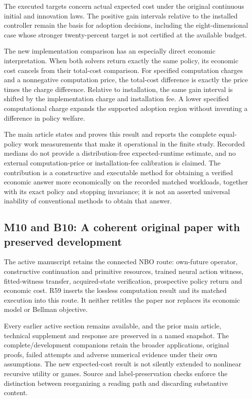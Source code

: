 \documentclass[ecta,nameyear,draft]{econsocart}
\begin{document}
The executed targets concern actual expected cost under the original
continuous initial and innovation laws. The positive gain intervals
relative to the installed controller remain the basis for adoption
decisions, including the eight-dimensional case whose stronger
twenty-percent target is not certified at the available budget.

The new implementation comparison has an especially direct economic
interpretation. When both solvers return exactly the same policy, its
economic cost cancels from their total-cost comparison. For specified
computation charges and a nonnegative computation price, the total-cost
difference is exactly the price times the charge difference. Relative to
installation, the same gain interval is shifted by the implementation
charge and installation fee. A lower specified computational charge
expands the supported adoption region without inventing a difference in
policy welfare.

The main article states and proves this result and reports the complete
equal-policy work measurements that make it operational in the finite
study. Recorded medians do not provide a distribution-free
expected-runtime estimate, and no external computation-price or
installation-fee calibration is claimed. The contribution is a
constructive and executable method for obtaining a verified economic
answer more economically on the recorded matched workloads, together
with its exact policy and stopping invariance; it is not an asserted
universal inability of conventional methods to obtain that answer.

\hypertarget{m10-and-b10-a-coherent-original-paper-with-preserved-development}{%
\subsection{M10 and B10: A coherent original paper with preserved
development}\label{m10-and-b10-a-coherent-original-paper-with-preserved-development}}

The active manuscript retains the connected NBO route: own-future
operator, constructive continuation and primitive resources, trained
neural action witness, fitted-witness transfer, acquired-state
verification, prospective policy return and economic cost. R59 inserts
the lossless computation result and its matched execution into this
route. It neither retitles the paper nor replaces its economic model or
Bellman objective.

Every earlier active section remains available, and the prior main
article, technical supplement and response are preserved in a named
snapshot. The complete/development companions retain the broader
applications, original proofs, failed attempts and adverse numerical
evidence under their own assumptions. The new expected-cost result is
not silently extended to nonlinear recursive utility or games. Source
and label-preservation checks enforce the distinction between
reorganizing a reading path and discarding substantive content.
\end{document}
